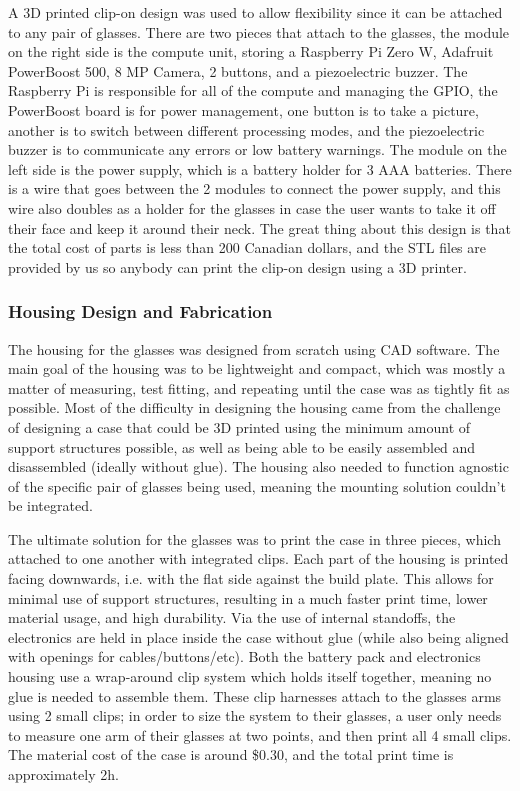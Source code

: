 \documentclass[a4paper,11pt]{article}
\begin{document}
A 3D printed clip-on design was used to allow flexibility since it can be attached to any pair of glasses. There are two pieces that attach to the glasses, the module on the right side is the compute unit, storing a Raspberry Pi Zero W, Adafruit PowerBoost 500, 8 MP Camera, 2 buttons, and a piezoelectric buzzer. The Raspberry Pi is responsible for all of the compute and managing the GPIO, the PowerBoost board is for power management, one button is to take a picture, another is to switch between different processing modes, and the piezoelectric buzzer is to communicate any errors or low battery warnings. The module on the left side is the power supply, which is a battery holder for 3 AAA batteries. There is a wire that goes between the 2 modules to connect the power supply, and this wire also doubles as a holder for the glasses in case the user wants to take it off their face and keep it around their neck. The great thing about this design is that the total cost of parts is less than 200 Canadian dollars, and the STL files are provided by us so anybody can print the clip-on design using a 3D printer.

\subsubsection{Housing Design and Fabrication}
The housing for the glasses was designed from scratch using CAD software. The main goal of the housing was to be lightweight and compact, which was mostly a matter of measuring, test fitting, and repeating until the case was as tightly fit as possible. Most of the difficulty in designing the housing came from the challenge of designing a case that could be 3D printed using the minimum amount of support structures possible, as well as being able to be easily assembled and disassembled (ideally without glue). The housing also needed to function agnostic of the specific pair of glasses being used, meaning the mounting solution couldn't be integrated.

The ultimate solution for the glasses was to print the case in three pieces, which attached to one another with integrated clips. Each part of the housing is printed facing downwards, i.e. with the flat side against the build plate. This allows for minimal use of support structures, resulting in a much faster print time, lower material usage, and high durability. Via the use of internal standoffs, the electronics are held in place inside the case without glue (while also being aligned with openings for cables/buttons/etc). Both the battery pack and electronics housing use a wrap-around clip system which holds itself together, meaning no glue is needed to assemble them. These clip harnesses attach to the glasses arms using 2 small clips; in order to size the system to their glasses, a user only needs to measure one arm of their glasses at two points, and then print all 4 small clips. The material cost of the case is around \$0.30, and the total print time is approximately 2h.
\end{document}
